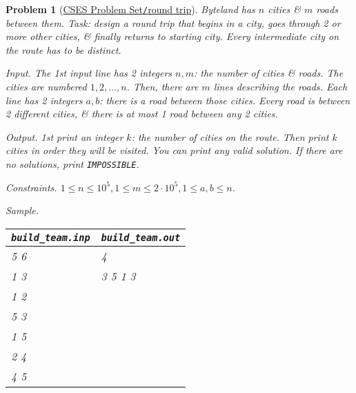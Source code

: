 \documentclass{article}
\newtheorem{problem}{Problem}
\begin{document}
\begin{problem}[\href{https://cses.fi/problemset/task/1669}{CSES Problem Set{\tt/}round trip}]
	Byteland has $n$ cities \& $m$ roads between them. Task: design a round trip that begins in a city, goes through 2 or more other cities, \& finally returns to starting city. Every intermediate city on the route has to be distinct.
	\item {\sf Input.} The 1st input line has 2 integers $n,m$: the number of cities \& roads. The cities are numbered $1,2,\ldots,n$. Then, there are $m$ lines describing the roads. Each line has 2 integers $a,b$: there is a road between those cities. Every road is between 2 different cities, \& there is at most 1 road between any 2 cities.
	\item {\sf Output.} 1st print an integer $k$: the number of cities on the route. Then print $k$ cities in order they will be visited. You can print any valid solution. If there are no solutions, print {\tt IMPOSSIBLE}.
	\item {\sf Constraints.} $1\le n\le10^5,1\le m\le2\cdot10^5,1\le a,b\le n$.
	\item {\sf Sample.}
	\begin{table}[H]
		\centering
		\begin{tabular}{|l|l|}
			\hline
			\verb|build_team.inp| & \verb|build_team.out| \\
			\hline
			5 6 & 4 \\
			1 3 & 3 5 1 3 \\
			1 2 & \\
			5 3 & \\
			1 5 & \\
			2 4 & \\
			4 5 & \\
			\hline
		\end{tabular}
	\end{table}
\end{problem}
\end{document}
